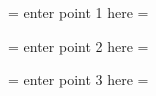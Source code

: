 \documentclass{agujournal}
\begin{document}









\begin{keypoints}
\item = enter point 1 here = 
\item = enter point 2 here = 
\item = enter point 3 here = 
\end{keypoints}

%
%

\end{document}

